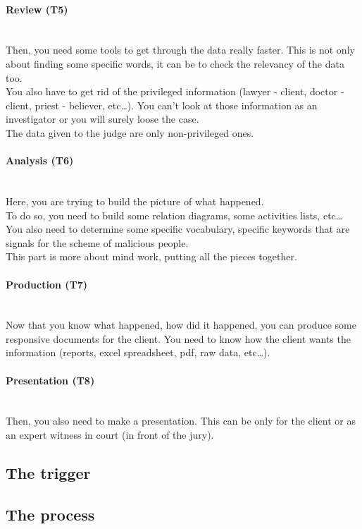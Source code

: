 \paragraph{Review (T5)}~\\
Then, you need some tools to get through the data really faster. This is not only about finding some specific words, it can be to check the relevancy of the data too.\\
You also have to get rid of the privileged information (lawyer - client, doctor - client, priest - believer, etc\ldots). You can't look at those information as an investigator or you will surely loose the case.\\
The data given to the judge are only non-privileged ones.
\paragraph{Analysis (T6)}~\\
Here, you are trying to build the picture of what happened.\\
To do so, you need to build some relation diagrams, some activities lists, etc\ldots\\
You also need to determine some specific vocabulary, specific keywords that are signals for the scheme of malicious people.\\
This part is more about mind work, putting all the pieces together.
\paragraph{Production (T7)}~\\
Now that you know what happened, how did it happened, you can produce some responsive documents for the client. You need to know how the client wants the information (reports, excel spreadsheet, pdf, raw data, etc\ldots).
\paragraph{Presentation (T8)}~\\
Then, you also need to make a presentation. This can be only for the client or as an expert witness in court (in front of the jury).
\subsection{The trigger}

\subsection{The process}
